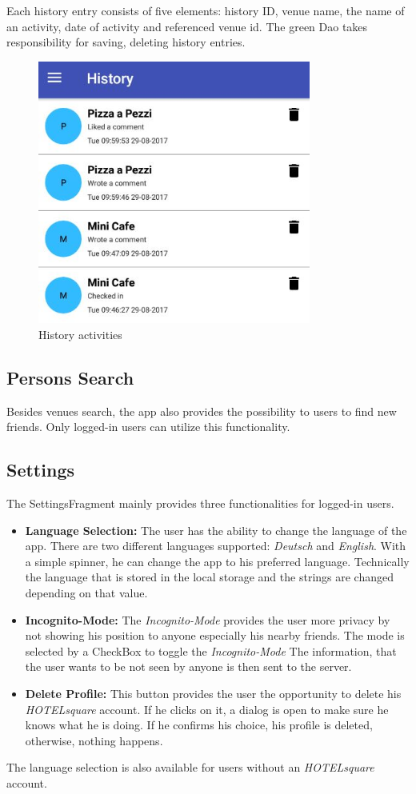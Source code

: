 Each history entry consists of five elements: history ID, venue name, the name of an activity, date of activity and referenced venue id. The green Dao takes responsibility for saving, deleting history entries.
\begin{figure}[htbp]
	\includegraphics[width=0.8\textwidth]{images/history.jpg}
	\centering
	\caption{History activities}\label{fig:history}
\end{figure}

\subsection{Persons Search}
Besides venues search, the app also provides the possibility to users to find new friends. Only logged-in users can utilize this functionality. 
\subsection{Settings}
The SettingsFragment mainly provides three functionalities for logged-in users.

\begin{itemize}
\item \textbf{Language Selection:} The user has the ability to change the language of the app. There are two different languages supported: \textit{Deutsch} and \textit{English}. With a simple spinner, he can change the app to his preferred language. Technically the language that is stored in the local storage and the strings are changed depending on that value.
\item \textbf{Incognito-Mode:} The \textit{Incognito-Mode} provides the user more privacy by not showing his position to anyone especially his nearby friends. The mode is selected by a CheckBox to toggle the \textit{Incognito-Mode} The information, that the user wants to be not seen by anyone is then sent to the server.
\item \textbf{Delete Profile:} This button provides the user the opportunity to delete his \textit{HOTELsquare} account. If he clicks on it, a dialog is open to make sure he knows what he is doing. If he confirms his choice, his profile is deleted, otherwise, nothing happens.
\end{itemize}

The language selection is also available for users without an \textit{HOTELsquare} account.


